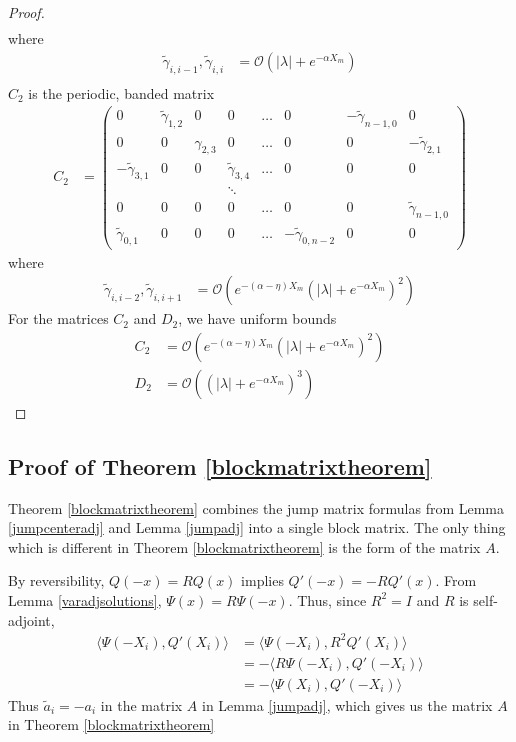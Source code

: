 \documentclass[thesis.tex]{subfiles}
\begin{document}
\begin{lemma}
\begin{proof}
\begin{align*}
\end{align*}
where 
\begin{align*}
\tilde{\gamma}_{i,i-1}, \tilde{\gamma}_{i,i} &= \mathcal{O}(|\lambda| + e^{-\alpha X_m}) \\
\end{align*}
$C_2$ is the periodic, banded matrix
\begin{align*}
C_2 &= \begin{pmatrix}
0 & \tilde{\gamma}_{1,2} & 0 & 0 & \dots & 0 & -\tilde{\gamma}_{n-1,0} & 0 \\
0 & 0 & \gamma_{2,3} & 0 & \dots & 0 & 0 & -\tilde{\gamma}_{2,1} \\
-\tilde{\gamma}_{3,1} & 0 & 0 & \tilde{\gamma}_{3,4} & \dots & 0 & 0 & 0 \\
&  & & \ddots  \\
0 & 0 & 0 & 0 & \dots & 0 & 0 & \tilde{\gamma}_{n-1,0} \\
\tilde{\gamma}_{0,1} & 0 & 0 & 0 & \dots & -\tilde{\gamma}_{0, n-2} & 0 & 0 
\end{pmatrix}
\end{align*}
where
\begin{align*}
\tilde{\gamma}_{i,i-2}, \tilde{\gamma}_{i,i+1} &= \mathcal{O}(e^{-(\alpha - \eta) X_m}(|\lambda| + e^{-\alpha X_m})^2) 
\end{align*}
For the matrices $C_2$ and $D_2$, we have uniform bounds
\begin{align*}
C_2 &= \mathcal{O}(e^{-(\alpha - \eta) X_m}(|\lambda| + e^{-\alpha X_m})^2) \\
D_2 &= \mathcal{O}((|\lambda| + e^{-\alpha X_m})^3)
\end{align*}
\end{proof}
\end{lemma}

\subsection{Proof of Theorem \ref{blockmatrixtheorem}}

Theorem \ref{blockmatrixtheorem} combines the jump matrix formulas from Lemma \ref{jumpcenteradj} and Lemma \ref{jumpadj} into a single block matrix. The only thing which is different in Theorem \ref{blockmatrixtheorem} is the form of the matrix $A$.

By reversibility, $Q(-x) = R Q(x)$ implies $Q'(-x) = -R Q'(x)$. From Lemma \ref{varadjsolutions}, $\Psi(x) = R \Psi(-x)$. Thus, since $R^2 = I$ and $R$ is self-adjoint,
\begin{align*}
\langle \Psi(-X_i), Q'(X_i) \rangle &= \langle \Psi(-X_i), R^2 Q'(X_i) \rangle \\
&= -\langle R \Psi(-X_i), Q'(-X_i) \rangle \\
&= -\langle \Psi(X_i), Q'(-X_i) \rangle
\end{align*}
Thus $\tilde{a}_i = -a_i$ in the matrix $A$ in Lemma \ref{jumpadj}, which gives us the matrix $A$ in Theorem \ref{blockmatrixtheorem} 
\end{document}
